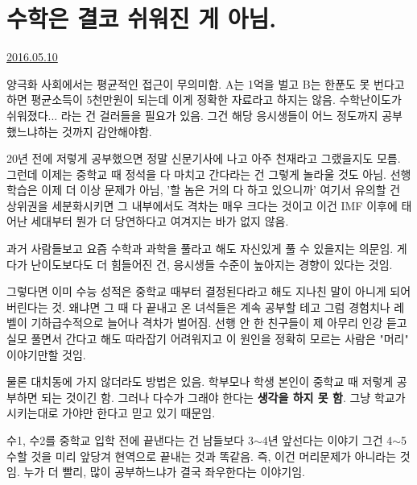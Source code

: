 \section{수학은 결코 쉬워진 게 아님.}
\href{https://www.kockoc.com/Apoc/767358}{2016.05.10}

\vspace{5mm}

양극화 사회에서는 평균적인 접근이 무의미함.
A는 1억을 벌고 B는 한푼도 못 번다고 하면 평균소득이 5천만원이 되는데 이게 정확한 자료라고 하지는 않음.
수학난이도가 쉬워졌다... 라는 건 걸러들을 필요가 있음.
그건 해당 응시생들이 어느 정도까지 공부했느냐하는 것까지 감안해야함.
\vspace{5mm}

20년 전에 저렇게 공부했으면 정말 신문기사에 나고 아주 천재라고 그랬을지도 모름.
그런데 이제는 중학교 때 정석을 다 마치고 간다라는 건 그렇게 놀라울 것도 아님.
선행학습은 이제 더 이상 문제가 아님, '할 놈은 거의 다 하고 있으니까'
여기서 유의할 건 상위권을 세분화시키면 그 내부에서도 격차는 매우 크다는 것이고
이건 IMF 이후에 태어난 세대부터 뭔가 더 당연하다고 여겨지는 바가 없지 않음.
\vspace{5mm}

과거 사람들보고 요즘 수학과 과학을 풀라고 해도 자신있게 풀 수 있을지는 의문임.
게다가 난이도보다도 더 힘들어진 건, 응시생들 수준이 높아지는 경향이 있다는 것임.
\vspace{5mm}

그렇다면 이미 수능 성적은 중학교 때부터 결정된다라고 해도 지나친 말이 아니게 되어버린다는 것.
왜냐면 그 때 다 끝내고 온 녀석들은 계속 공부할 테고 그럼 경험치나 레벨이 기하급수적으로 늘어나 격차가 벌어짐.
선행 안 한 친구들이 제 아무리 인강 듣고 실모 풀면서 간다고 해도 따라잡기 어려워지고
이 원인을 정확히 모르는 사람은 "머리" 이야기만할 것임.
\vspace{5mm}

물론 대치동에 가지 않더라도 방법은 있음. 학부모나 학생 본인이 중학교 때 저렇게 공부하면 되는 것이긴 함.
그러나 다수가 그래야 한다는 \textbf{생각을 하지 못 함}. 그냥 학교가 시키는대로 가야만 한다고 믿고 있기 때문임.
\vspace{5mm}

수1, 수2를 중학교 입학 전에 끝낸다는 건 남들보다 3$\sim$4년 앞선다는 이야기
그건 4$\sim$5수할 것을 미리 앞당겨 현역으로 끝내는 것과 똑같음. 즉, 이건 머리문제가 아니라는 것임.
누가 더 빨리, 많이 공부하느냐가 결국 좌우한다는 이야기임.
\vspace{5mm}











